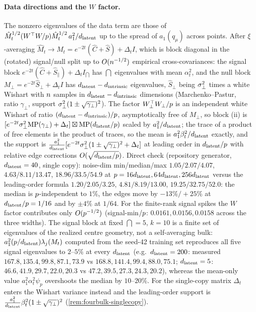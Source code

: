 \paragraph{Data directions and the $W$ factor.}
The nonzero eigenvalues of the data term are those of $\hat M_t^{1/2}(W^\top W/p)\hat M_t^{1/2}\,a_1^2/d_{\mathrm{latent}}$ up to the spread of $a_1(q_\mu)$ across points. After $\xi$-averaging $\hat M_t\to M_t=e^{-2t}(\hat C+\hat S)+\Delta_t I$, which is block diagonal in the (rotated) signal/null split up to $O(n^{-1/2})$ empirical cross-covariances: the signal block $e^{-2t}(\hat C+\hat S_\parallel)+\Delta_t I_{\dint}$ has $\dint$ eigenvalues with mean $\alpha_t^2$, and the null block $M_\perp=e^{-2t}\hat S_\perp+\Delta_t I$ has $d_{\mathrm{latent}}-d_{\mathrm{intrinsic}}$ eigenvalues, $\hat S_\perp$ being $\sigma_{\perp}^2$ times a white Wishart with $n$ samples in $d_{\mathrm{latent}}-d_{\mathrm{intrinsic}}$ dimensions (Marchenko--Pastur, ratio $\gamma_\perp$, support $\sigma_{\perp}^2(1\pm\sqrt{\gamma_\perp})^2$). The factor $W_\perp^\top W_\perp/p$ is an independent white Wishart of ratio $(d_{\mathrm{latent}}-d_{\mathrm{intrinsic}})/p$, asymptotically free of $M_\perp$, so block (ii) is $[e^{-2t}\sigma_{\perp}^2\mathrm{MP}(\gamma_\perp)+\Delta_t]\boxtimes\mathrm{MP}(d_{\mathrm{latent}}/p)$ scaled by $a_1^2/d_{\mathrm{latent}}$; the trace of a product of free elements is the product of traces, so the mean is $a_1^2\beta_t^2/d_{\mathrm{latent}}$ exactly, and the support is $\tfrac{a_1^2}{d_{\mathrm{latent}}}[e^{-2t}\sigma_{\perp}^2(1\pm\sqrt{\gamma_\perp})^2+\Delta_t]$ at leading order in $d_{\mathrm{latent}}/p$ with relative edge corrections $O(\sqrt{d_{\mathrm{latent}}/p})$. Direct check (repository generator, $d_{\mathrm{latent}}=40$, single copy): noise-dim min/median/max $1.05/2.07/4.07$, $4.63/8.11/13.47$, $18.96/33.5/54.9$ at $p=16d_{\mathrm{latent}},64d_{\mathrm{latent}},256d_{\mathrm{latent}}$ versus the leading-order formula $1.20/2.05/3.25$, $4.81/8.19/13.00$, $19.25/32.75/52.0$: the median is $p$-independent to $1\%$, the edges move by $-13\%/+25\%$ at $d_{\mathrm{latent}}/p=1/16$ and by $\pm4\%$ at $1/64$. For the finite-rank signal spikes the $W$ factor contributes only $O(p^{-1/2})$ (signal-min$/p$: $0.0161,0.0156,0.0158$ across the three widths). The signal block at fixed $\dint=5$, $k=10$ is a finite set of eigenvalues of the realized centre geometry, not a self-averaging bulk: $a_1^2(p/d_{\mathrm{latent}})\lambda_j(M_t)$ computed from the seed-42 training set reproduces all five signal eigenvalues to $2$--$5\%$ at every $d_{\mathrm{latent}}$ (e.g.\ $d_{\mathrm{latent}}=200$: measured $167.8,135.4,99.8,87.1,73.9$ vs $168.8,141.4,99.4,88.0,75.1$; $d_{\mathrm{latent}}=5$: $46.6,41.9,29.7,22.0,20.3$ vs $47.2,39.5,27.3,24.3,20.2$), whereas the mean-only value $a_1^2\alpha_t^2\psi_p$ overshoots the median by $10$--$20\%$. For the single-copy matrix $\Delta_t$ enters the Wishart variance instead and the leading-order support is $\tfrac{a_1^2}{d_{\mathrm{latent}}}\beta_t^2(1\pm\sqrt{\gamma_\perp})^2$ (\cref{rem:fourbulk-singlecopy}).

